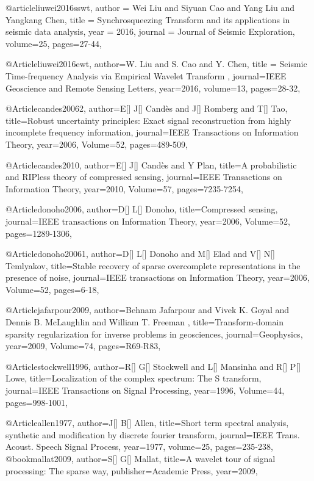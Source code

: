 @article{liuwei2016sswt,
  author =	 {Wei Liu and Siyuan Cao and Yang Liu and Yangkang Chen},
  title =	 {Synchrosqueezing Transform and its applications in seismic data analysis},
  year =	 2016,
  journal =	 {Journal of Seismic Exploration},
  volume={25},
 pages={27-44},
}

@Article{liuwei2016ewt,
  author={W. Liu and S. Cao and Y. Chen},
  title = {Seismic Time-frequency Analysis via Empirical Wavelet Transform
},
  journal={IEEE Geoscience and Remote Sensing Letters},
  year=2016,
  volume=13,
  pages={28-32},
}

@Article{candes20062,
  author={E[] J[] Cand\`{e}s and J[] Romberg and T[] Tao},
  title={Robust uncertainty principles: Exact signal reconstruction from highly incomplete frequency information},
  journal={IEEE Transactions on Information Theory},
  year=2006,
  Volume=52,
  pages={489-509},
}

@Article{candes2010,
  author={E[] J[] Cand\`{e}s and Y Plan},
  title={A probabilistic and RIPless theory of compressed sensing},
  journal={IEEE Transactions on Information Theory},
  year=2010,
  Volume=57,
  pages={7235-7254},
}


@Article{donoho2006,
  author={D[] L[] Donoho},
  title={Compressed sensing},
  journal={IEEE transactions on Information Theory},
  year=2006,
  Volume=52,
  pages={1289-1306},
}

@Article{donoho20061,
  author={D[] L[] Donoho and M[] Elad and V[] N[] Temlyakov},
  title={Stable recovery of sparse overcomplete representations in the presence of noise},
  journal={IEEE transactions on Information Theory},
  year=2006,
  Volume=52,
  pages={6-18},
}

@Article{jafarpour2009,
  author={Behnam Jafarpour and Vivek K. Goyal and Dennis B. McLaughlin and William T. Freeman },
  title={Transform-domain sparsity regularization for inverse problems in
geosciences},
  journal={Geophysics},
  year=2009,
  Volume=74,
  pages={R69-R83},
}

@Article{stockwell1996,
  author={R[] G[] Stockwell and L[] Mansinha and R[] P[] Lowe},
  title={Localization of the complex spectrum: The S transform},
  journal={IEEE Transactions on Signal Processing},
  year=1996,
  Volume=44,
  pages={998-1001},
}

@Article{allen1977,
  author={J[] B[] Allen},
  title={Short term spectral analysis, synthetic and modification by discrete fourier transform},
  journal={IEEE Trans. Acoust. Speech Signal Process},
  year=1977,
  volume=25,
  pages={235-238},
}
@book{mallat2009,
  author={S[] G[] Mallat},
  title={A wavelet tour of signal processing: The sparse way},
  publisher={Academic Press},
  year=2009,
}

